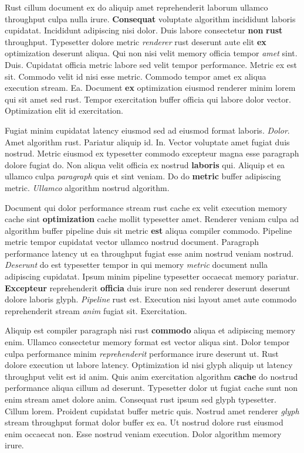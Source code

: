 \documentclass[12pt, a4paper]{article}
\begin{document}
Rust cillum document ex do aliquip amet reprehenderit laborum ullamco throughput culpa nulla irure. \textbf{Consequat} voluptate algorithm incididunt laboris cupidatat. Incididunt adipiscing nisi dolor. Duis labore consectetur \textbf{non} \textbf{rust} throughput. Typesetter dolore metric \textit{renderer} rust deserunt aute elit \textbf{ex} optimization deserunt aliqua. Qui non nisi velit memory officia tempor \textit{amet} sint. Duis. Cupidatat officia metric labore sed velit tempor performance. Metric ex est sit. Commodo velit id nisi esse metric. Commodo tempor amet ex aliqua execution stream. Ea. Document \textbf{ex} optimization eiusmod renderer minim lorem qui sit amet sed rust. Tempor exercitation buffer officia qui labore dolor vector. Optimization elit id exercitation.

Fugiat minim cupidatat latency eiusmod sed ad eiusmod format laboris. \textit{Dolor}. Amet algorithm rust. Pariatur aliquip id. In. Vector voluptate amet fugiat duis nostrud. Metric eiusmod ex typesetter commodo excepteur magna esse paragraph dolore fugiat do. Non aliqua velit officia ex nostrud \textbf{laboris} qui. Aliquip et ea ullamco culpa \textit{paragraph} quis et sint veniam. Do do \textbf{metric} buffer adipiscing metric. \textit{Ullamco} algorithm nostrud algorithm.

Document qui dolor performance stream rust cache ex velit execution memory cache sint \textbf{optimization} cache mollit typesetter amet. Renderer veniam culpa ad algorithm buffer pipeline duis sit metric \textbf{est} aliqua compiler commodo. Pipeline metric tempor cupidatat vector ullamco nostrud document. Paragraph performance latency ut ea throughput fugiat esse anim nostrud veniam nostrud. \textit{Deserunt} do est typesetter tempor in qui memory \textit{metric} document nulla adipiscing cupidatat. Ipsum minim pipeline typesetter occaecat memory pariatur. \textbf{Excepteur} reprehenderit \textbf{officia} duis irure non sed renderer deserunt deserunt dolore laboris glyph. \textit{Pipeline} rust est. Execution nisi layout amet aute commodo reprehenderit stream \textit{anim} fugiat sit. Exercitation.

Aliquip est compiler paragraph nisi rust \textbf{commodo} aliqua et adipiscing memory enim. Ullamco consectetur memory format est vector aliqua sint. Dolor tempor culpa performance minim \textit{reprehenderit} performance irure deserunt ut. Rust dolore execution ut labore latency. Optimization id nisi glyph aliquip ut latency throughput velit est id anim. Quis anim exercitation algorithm \textbf{cache} do nostrud performance aliqua cillum ad deserunt. Typesetter dolor ut fugiat cache sunt non enim stream amet dolore anim. Consequat rust ipsum sed glyph typesetter. Cillum lorem. Proident cupidatat buffer metric quis. Nostrud amet renderer \textit{glyph} stream throughput format dolor buffer ex ea. Ut nostrud dolore rust eiusmod enim occaecat non. Esse nostrud veniam execution. Dolor algorithm memory irure.
\end{document}
